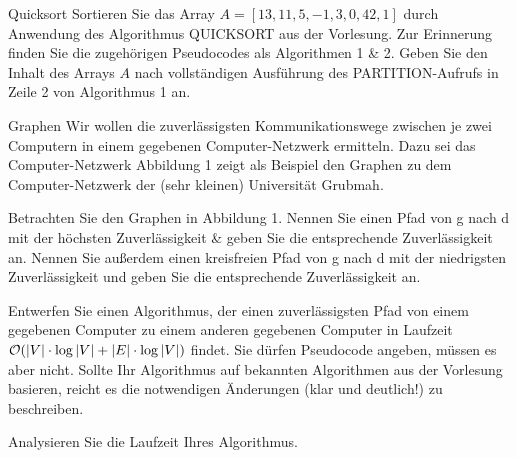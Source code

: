 \documentclass{article}
\begin{document}
\begin{exercise}{Quicksort}
  Sortieren Sie das Array $A = [13,11,5, -1,3,0,42,1]$ durch Anwendung des Algorithmus QUICKSORT aus der Vorlesung. Zur Erinnerung finden Sie die zugehörigen Pseudocodes als Algorithmen 1 \& 2. Geben Sie den Inhalt des Arrays $A$ nach vollständigen Ausführung des PARTITION-Aufrufs in Zeile 2 von Algorithmus 1 an.
  \begin{algorithm}[ht]
    \caption{QUICKSORT($A, l, r$)}
  \end{algorithm}
\end{exercise}

\begin{eexercises}{Graphen}{
    Wir wollen die zuverlässigsten Kommunikationswege zwischen je zwei Computern in einem gegebenen Computer-Netzwerk ermitteln. Dazu sei das Computer-Netzwerk Abbildung 1 zeigt als Beispiel den Graphen zu dem Computer-Netzwerk der (sehr kleinen) Universität Grubmah.
  }
  \item Betrachten Sie den Graphen in Abbildung 1. Nennen Sie einen Pfad von g nach d mit der höchsten Zuverlässigkeit \& geben Sie die entsprechende Zuverlässigkeit an. Nennen Sie außerdem einen kreisfreien Pfad von g nach d mit der niedrigsten Zuverlässigkeit und geben Sie die entsprechende Zuverlässigkeit an.
  \item Entwerfen Sie einen Algorithmus, der einen zuverlässigsten Pfad von einem gegebenen Computer zu einem anderen gegebenen Computer in Laufzeit $\mathcal{O}(|V| \cdot \log|V| + |E| \cdot \log|V|)$ findet. Sie dürfen Pseudocode angeben, müssen es aber nicht. Sollte Ihr Algorithmus auf bekannten Algorithmen aus der Vorlesung basieren, reicht es die notwendigen Änderungen (klar und deutlich!) zu beschreiben.
  \item Analysieren Sie die Laufzeit Ihres Algorithmus.
\end{eexercises}
\end{document}
